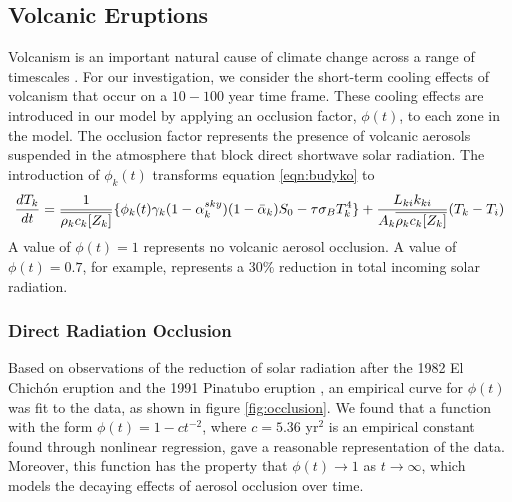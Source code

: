 \documentclass[12pt]{article}
\newcommand*\mean[1]{\overline{#1}}
\begin{document}
\subsection{Volcanic Eruptions} \label{sec:Volcanos}
Volcanism is an important natural cause of climate change across a range of
timescales \parencite{robock}. For our investigation, we consider the
short-term cooling effects of volcanism that occur on a $10-100$ year time frame.
These cooling effects are introduced in our model by applying an occlusion factor,
$\phi(t)$, to each zone in the model. The
occlusion factor represents the presence of volcanic aerosols suspended in the
atmosphere that block direct shortwave solar radiation.
The introduction of $\phi_k(t)$
transforms equation \ref{eqn:budyko} to
\begin{equation} \label{eqn:occlusion}
\frac{dT_k}{dt} = \frac{1}{\mean{\rho_kc_k[Z_k]}}
\{
    \phi_k(t)\gamma_k(1-\alpha_k^{sky})(1-\Bar{\alpha}_k)S_0-\tau\sigma_BT_k^{4}
\} +
\frac{L_{ki}k_{ki}}{{A_k}\mean{\rho_kc_k[Z_k]}}(T_{k}-T_{i})
\end{equation}
A value of $\phi(t) = 1$ represents no volcanic aerosol occlusion. A value
of $\phi(t) = 0.7$, for example, represents a $30\%$ reduction in total
incoming solar radiation.

\subsubsection{Direct Radiation Occlusion} \label{sec:Occlusion}
Based on observations of the reduction of solar radiation after the
1982 El Chichón eruption and the 1991 Pinatubo eruption \parencite{robock},
an empirical curve for $\phi(t)$ was fit to the data, as shown
in figure \ref{fig:occlusion}. We found that a function with the form
$\phi(t) = 1 - ct^{-2}$, where $c=5.36$ yr$^2$ is an empirical constant found through
nonlinear regression, gave a reasonable representation of the data.
Moreover, this function has the property that $\phi(t) \to 1$ as $t \to \infty$,
which models the decaying effects of aerosol occlusion over time.
\end{document}
